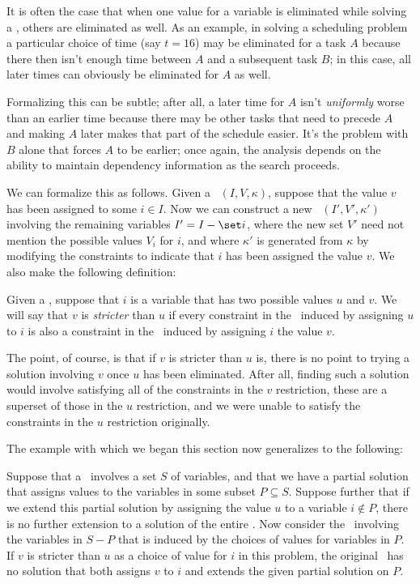 It is often the case that when one value for a variable is eliminated
while solving a \csp, others are eliminated as well.  As an example,
in solving a scheduling problem a particular choice of time (say
$t=16$) may be eliminated for a task $A$ because there then isn't
enough time between $A$ and a subsequent task $B$; in this case, all
later times can obviously be eliminated for $A$ as well.

Formalizing this can be subtle; after all, a later time for $A$ isn't
{\em uniformly\/} worse than an earlier time because there may be
other tasks that need to precede $A$ and making $A$ later makes that
part of the schedule easier.  It's the problem with $B$ alone that
forces $A$ to be earlier; once again, the analysis depends on the
ability to maintain dependency information as the search proceeds.

We can formalize this as follows.  Given a \csp\ $(I,V,\kappa)$,
suppose that the value $v$ has been assigned to some $i\in I$.  Now we
can construct a new \csp\ $(I',V',\kappa')$ involving the remaining
variables $I'=I-\set i$, where the new set $V'$ need not mention the
possible values $V_i$ for $i$, and where $\kappa'$ is generated from
$\kappa$ by modifying the constraints to indicate that $i$ has been
assigned the value $v$.  We also make the following definition:

\begin{definition} Given a \csp, suppose that $i$ is a variable that
has two possible values $u$ and $v$.  We will say that $v$ is {\em
stricter\/} than $u$ if every constraint in the \csp\ induced by
assigning $u$ to $i$ is also a constraint in the \csp\ induced by
assigning $i$ the value $v$.
 \end{definition}

The point, of course, is that if $v$ is stricter than $u$ is, there is
no point to trying a solution involving $v$ once $u$ has been
eliminated.  After all, finding such a solution would involve
satisfying all of the constraints in the $v$ restriction, these are a
superset of those in the $u$ restriction, and we were unable to
satisfy the constraints in the $u$ restriction originally.

The example with which we began this section now generalizes to the
following:

\begin{proposition} Suppose that a \csp\ involves a set $S$ of
variables, and that we have a partial solution that assigns values to
the variables in some subset $P\subseteq S$.  Suppose further that if
we extend this partial solution by assigning the value $u$ to a
variable $i\not\in P$, there is no further extension to a solution of
the entire \csp.  Now consider the \csp\ involving the variables in
$S-P$ that is induced by the choices of values for variables in $P$.
If $v$ is stricter than $u$ as a choice of value for $i$ in this
problem, the original \csp\ has no solution that both assigns $v$ to
$i$ and extends the given partial solution on $P$.\proofend
 \label{p.strict}
 \end{proposition}

